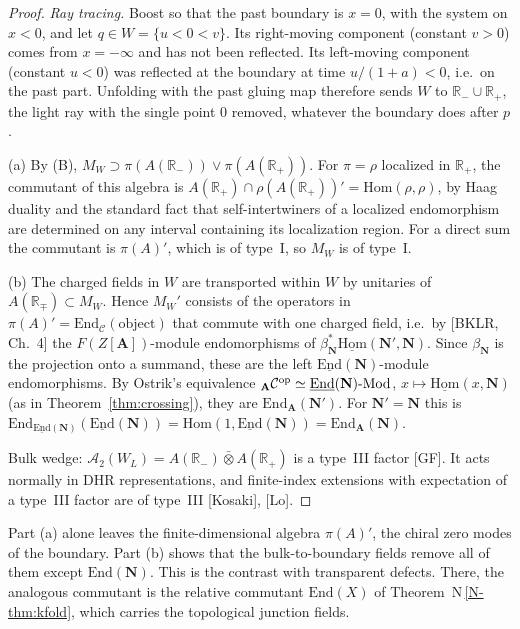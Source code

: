 \documentclass[11pt]{article}
\theoremstyle{definition}
\theoremstyle{remark}
\newcommand{\cA}{\mathcal A}
\newcommand{\bfA}{\mathbf A}
\newcommand{\nref}[1]{N\,\ref{N-#1}}
\begin{document}
\begin{proof}
\emph{Ray tracing.} Boost so that the past boundary is $x=0$, with the system on $x<0$, and let $q\in W=\{u<0<v\}$. Its right-moving component (constant $v>0$) comes from $x=-\infty$ and has not been reflected. Its left-moving component (constant $u<0$) was reflected at the boundary at time $u/(1+a)<0$, i.e.\ on the past part. Unfolding with the past gluing map therefore sends $W$ to $\mathbb R_-\cup\mathbb R_+$, the light ray with the single point $0$ removed, whatever the boundary does after $p$.

(a) By (B), $M_W\supset\pi(A(\mathbb R_-))\vee\pi(A(\mathbb R_+))$. For $\pi=\rho$ localized in $\mathbb R_+$, the commutant of this algebra is $A(\mathbb R_+)\cap\rho(A(\mathbb R_+))'=\mathrm{Hom}(\rho,\rho)$, by Haag duality and the standard fact that self-intertwiners of a localized endomorphism are determined on any interval containing its localization region. For a direct sum the commutant is $\pi(A)'$, which is of type~I, so $M_W$ is of type~I.

(b) The charged fields in $W$ are transported within $W$ by unitaries of $A(\mathbb R_\mp)\subset M_W$. Hence $M_W'$ consists of the operators in $\pi(A)'=\mathrm{End}_{\mathcal C}(\text{object})$ that commute with one charged field, i.e.\ by [BKLR, Ch.~4] the $F(Z[\bfA])$-module endomorphisms of $\beta_{\mathbf N}^*\underline{\mathrm{Hom}}(\mathbf N',\mathbf N)$. Since $\beta_{\mathbf N}$ is the projection onto a summand, these are the left $\underline{\mathrm{End}}(\mathbf N)$-module endomorphisms. By Ostrik's equivalence ${}_{\bfA}\mathcal C^{\rm op}\simeq\underline{\mathrm{End}}(\mathbf N)\text{-}\mathrm{Mod}$, $x\mapsto\underline{\mathrm{Hom}}(x,\mathbf N)$ (as in Theorem~\ref{thm:crossing}), they are $\mathrm{End}_{\bfA}(\mathbf N')$. For $\mathbf N'=\mathbf N$ this is $\mathrm{End}_{\underline{\mathrm{End}}(\mathbf N)}(\underline{\mathrm{End}}(\mathbf N))=\mathrm{Hom}(1,\underline{\mathrm{End}}(\mathbf N))=\mathrm{End}_{\bfA}(\mathbf N)$.

Bulk wedge: $\cA_2(W_L)=A(\mathbb R_-)\bar\otimes A(\mathbb R_+)$ is a type~III factor [GF]. It acts normally in DHR representations, and finite-index extensions with expectation of a type~III factor are of type~III [Kosaki], [Lo].
\end{proof}
Part (a) alone leaves the finite-dimensional algebra $\pi(A)'$, the chiral zero modes of the boundary. Part (b) shows that the bulk-to-boundary fields remove all of them except $\mathrm{End}(\mathbf N)$. This is the contrast with transparent defects. There, the analogous commutant is the relative commutant $\mathrm{End}(X)$ of Theorem~\nref{thm:kfold}, which carries the topological junction fields.
\end{document}
